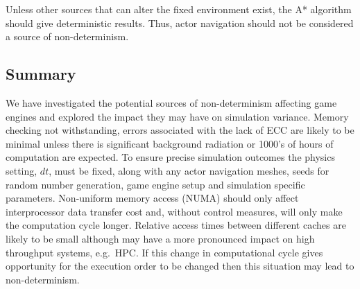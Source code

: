 \documentclass[runningheads,twocolumn,a4paper,10pt]{llncs}
\begin{document}
Unless other sources that can alter the fixed environment exist, the A* algorithm should give deterministic results. Thus, actor navigation should not be considered a source of non-determinism.
%
%

\subsection{Summary}
We have investigated the potential sources of non-determinism affecting game engines 
and explored the impact they may have on simulation variance. 
%
%
Memory checking not withstanding, errors associated with the lack of ECC are likely to be minimal unless there is significant background radiation or 1000's of hours of computation are expected.
%
To ensure precise simulation outcomes the physics setting, $dt$, must be fixed, along with any actor navigation meshes, seeds for random number generation, game engine setup and simulation specific parameters.
%
Non-uniform memory access (NUMA) should only affect interprocessor data transfer cost and, without control measures, will only make the computation cycle longer. Relative access times between different caches are likely to be small although may have a more pronounced impact on high throughput systems, e.g.\ HPC. If this change in computational cycle gives opportunity for the execution order to be changed then this situation may lead to non-determinism. 
\end{document}
